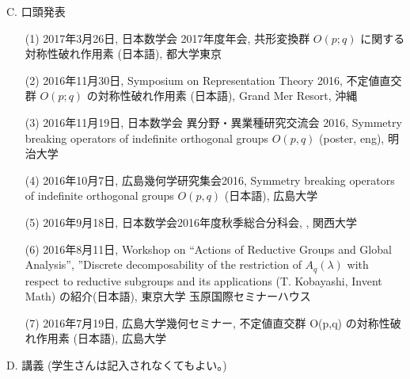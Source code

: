 \documentclass[a4j,twocolumn]{jarticle}
\begin{document}

\vspace{0.2cm}
\noindent
C. 口頭発表

\vspace{0.1cm}
\begin{enumerate}
	\item[(1)] 
2017年3月26日, 日本数学会 2017年度年会, 共形変換群 $O( p;q )$ に関する対称性破れ作用素 (日本語), 都大学東京
	\item[(2)] 
2016年11月30日, Symposium on Representation Theory 2016, 不定値直交群 $O ( p; q )$ の対称性破れ作用素 (日本語), Grand Mer Resort, 沖縄
	\item[(3)] 
2016年11月19日, 日本数学会 異分野・異業種研究交流会 2016, Symmetry breaking operators of indefinite orthogonal groups $O(p,q)$ (poster, eng), 明治大学
	\item[(4)] 
2016年10月7日, 広島幾何学研究集会2016, Symmetry breaking operators of indefinite orthogonal groups $O(p,q)$ (日本語), 広島大学
	\item[(5)] 
2016年9月18日, 日本数学会2016年度秋季総合分科会, , 関西大学
	\item[(6)] 
2016年8月11日, Workshop on “Actions of Reductive Groups and Global Analysis”, ”Discrete decomposability of the restriction of $A_q(\lambda)$ with respect to reductive subgroups and its applications (T. Kobayashi, Invent Math) の紹介(日本語), 東京大学 玉原国際セミナーハウス
	\item[(7)] 
2016年7月19日, 広島大学幾何セミナー, 不定値直交群 O(p,q) の対称性破れ作用素 (日本語), 広島大学
\end{enumerate}

\vspace{0.2cm}
\noindent
D. 講義 (学生さんは記入されなくてもよい。)
\end{document}
